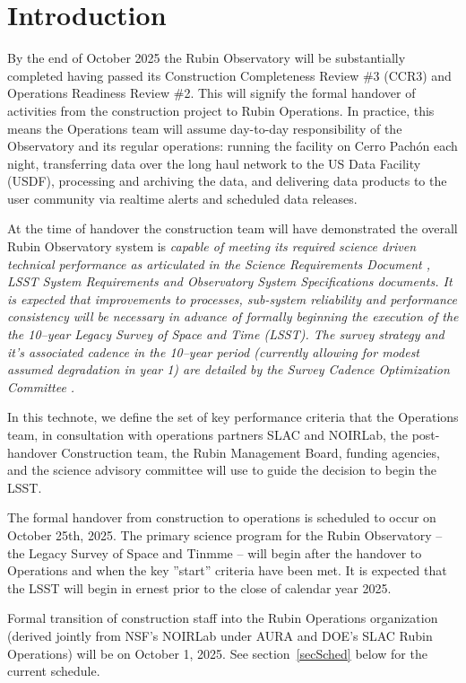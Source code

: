 \section{Introduction}

By the end of October 2025 the Rubin Observatory will be substantially completed having passed its Construction Completeness Review \#3 (CCR3) and Operations Readiness Review \#2.  This will signify the formal handover of activities from the construction project to Rubin Operations. In practice, this means the Operations team \cite[see][]{RDO-018} will assume day-to-day responsibility of the Observatory and its regular operations: running the facility on Cerro Pach\'{o}n each night, transferring data over the long haul network to the US Data Facility (USDF), processing and archiving the data, and delivering data products to the user community via realtime alerts and scheduled data releases. 

At the time of handover the construction team will have demonstrated the overall Rubin Observatory system is \it{capable} of meeting its required science driven technical performance as articulated in the Science Requirements Document \cite{SRD}, LSST System Requirements \cite{LSR} and Observatory System Specifications \cite{OSS} documents.  It is expected that improvements to processes, sub-system reliability and performance consistency will be necessary in advance of formally beginning the execution of the the 10--year Legacy Survey of Space and Time (LSST). The survey strategy and it's associated cadence in the 10--year period (currently allowing for modest assumed degradation in year 1) are detailed by the Survey Cadence Optimization Committee \cite[SCOC,][]{PSTN-056}. 

In this technote, we define the set of key performance criteria that the Operations team, in consultation with operations partners SLAC and NOIRLab, the post-handover Construction team, the Rubin Management Board, funding agencies, and the science advisory committee will use to guide the decision to begin the LSST. 

The formal handover from construction to operations is scheduled to occur on October 25th, 2025. The primary science program for the Rubin Observatory -- the Legacy Survey of Space and Tinmme -- will begin after the handover to Operations and when the key ''start'' criteria have been met.  It is expected that the LSST will begin in ernest prior to the close of calendar year 2025.

Formal transition of construction staff into the Rubin Operations organization (derived jointly from NSF's NOIRLab under AURA and DOE's SLAC Rubin Operations) will be on October 1, 2025. See section~\ref{secSched} below for the current schedule.  
